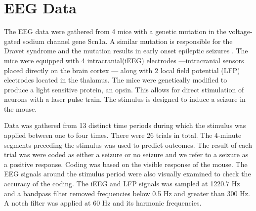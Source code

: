 

\section{EEG Data}

The EEG data were gathered from 4 mice with a genetic 
mutation in the voltage-gated sodium channel gene Scn1a. 
A similar mutation is responsible for the Dravet syndrome 
and the mutation results in early onset epileptic seizures \cite{ito2013}.
The mice were equipped with 4 intracranial(iEEG) electrodes ---intracranial sensors placed directly on the brain cortex ---  
along with 2 local field potential (LFP) electrodes located 
 in the thalamus. The mice were genetically modified to produce a 
 light sensitive protein, an opsin. This allows for direct 
 stimulation of neurons with a laser pulse train. The stimulus is designed to induce a seizure in the mouse.
 

Data was gathered from 13 distinct time periods during which the 
stimulus was applied between one to four times. There were 26 trials in total. 
The 4-minute segments preceding the stimulus was used 
to predict outcomes.
 The result of each trial was were coded as either a seizure 
 or no seizure and we refer to a seizure as a positive response. 
Coding was based on the visible response of the 
mouse. The EEG signals around the stimulus period were also visually examined to check the accuracy of the coding.
The iEEG and LFP signals was sampled at 1220.7 Hz and
a bandpass filter removed frequencies below 0.5 Hz and greater
than 300 Hz. A notch filter was applied at 60 Hz and its harmonic frequencies. 


